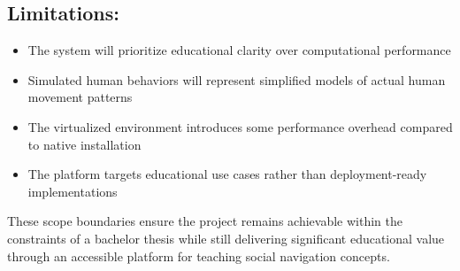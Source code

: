 \subsection*{Limitations:}
\begin{itemize}
    \item The system will prioritize educational clarity over computational performance
    \item Simulated human behaviors will represent simplified models of actual human movement patterns
    \item The virtualized environment introduces some performance overhead compared to native installation
    \item The platform targets educational use cases rather than deployment-ready implementations
\end{itemize}

These scope boundaries ensure the project remains achievable within the constraints of a 
bachelor thesis while still delivering significant educational value through an accessible 
platform for teaching social navigation concepts.